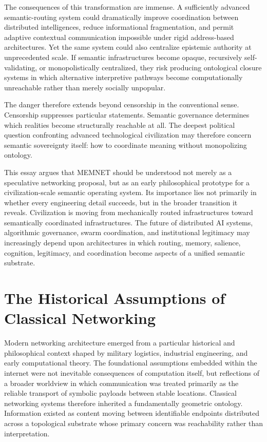 \documentclass[11pt,a4paper]{article}
\begin{document}
The consequences of this transformation are immense. A sufficiently advanced semantic-routing system could dramatically improve coordination between distributed intelligences, reduce informational fragmentation, and permit adaptive contextual communication impossible under rigid address-based architectures. Yet the same system could also centralize epistemic authority at unprecedented scale. If semantic infrastructures become opaque, recursively self-validating, or monopolistically centralized, they risk producing ontological closure systems in which alternative interpretive pathways become computationally unreachable rather than merely socially unpopular.

The danger therefore extends beyond censorship in the conventional sense. Censorship suppresses particular statements. Semantic governance determines which realities become structurally reachable at all. The deepest political question confronting advanced technological civilization may therefore concern semantic sovereignty itself: how to coordinate meaning without monopolizing ontology.

This essay argues that MEMNET should be understood not merely as a speculative networking proposal, but as an early philosophical prototype for a civilization-scale semantic operating system. Its importance lies not primarily in whether every engineering detail succeeds, but in the broader transition it reveals. Civilization is moving from mechanically routed infrastructures toward semantically coordinated infrastructures. The future of distributed AI systems, algorithmic governance, swarm coordination, and institutional legitimacy may increasingly depend upon architectures in which routing, memory, salience, cognition, legitimacy, and coordination become aspects of a unified semantic substrate.

\section{The Historical Assumptions of Classical Networking}

Modern networking architecture emerged from a particular historical and philosophical context shaped by military logistics, industrial engineering, and early computational theory. The foundational assumptions embedded within the internet were not inevitable consequences of computation itself, but reflections of a broader worldview in which communication was treated primarily as the reliable transport of symbolic payloads between stable locations. Classical networking systems therefore inherited a fundamentally geometric ontology. Information existed as content moving between identifiable endpoints distributed across a topological substrate whose primary concern was reachability rather than interpretation.
\end{document}
